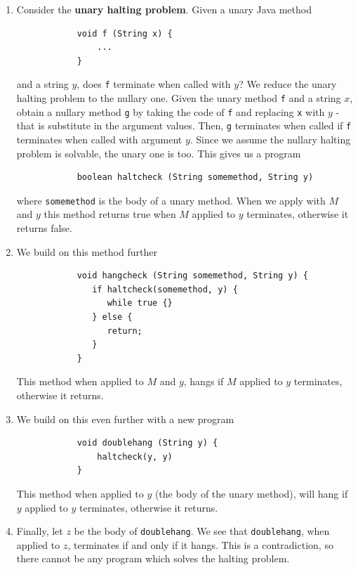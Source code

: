 \documentclass[11pt]{article}
\begin{document}
	\begin{enumerate}
		\item Consider the \textbf{unary halting problem}. Given a unary Java method
		\begin{verbatim}
			void f (String x) {
			    ...
			}
		\end{verbatim}			
		and a string $y$, does \texttt{f} terminate when called with $y$? We reduce the unary halting problem to the nullary one. Given the unary method \texttt{f} and a string $x$, obtain a nullary method \texttt{g} by taking the code of \texttt{f} and replacing \texttt{x} with $y$ - that is substitute in the argument values. Then, \texttt{g} terminates when called if \texttt{f} terminates when called with argument $y$. Since we assume the nullary halting problem is solvable, the unary one is too. This gives us a program
		\begin{verbatim}
			boolean haltcheck (String somemethod, String y)
		\end{verbatim}
		
		where \texttt{somemethod} is the body of a unary method. When we apply with $M$ and $y$ this method returns true when $M$ applied to $y$ terminates, otherwise it returns false.
	
	\item We build on this method further
		\begin{verbatim}
			void hangcheck (String somemethod, String y) {
			   if haltcheck(somemethod, y) {
			      while true {}
			   } else {
			      return;
			   }
			}
		\end{verbatim}	
		
		This method when applied to $M$ and $y$, hangs if $M$ applied to $y$ terminates, otherwise it returns.
				
	\item We build on this even further with a new program
		\begin{verbatim}
			void doublehang (String y) {
			    haltcheck(y, y)
			}
		\end{verbatim}
		
		This method when applied to $y$ (the body of the unary method), will hang if $y$ applied to $y$ terminates, otherwise it returns.
	
	\item Finally, let $z$ be the body of \texttt{doublehang}. We see that \texttt{doublehang}, when applied to $z$, terminates if and only if it hangs. This is a contradiction, so there cannot be any program which solves the halting problem.	
	
	\end{enumerate}
	
\end{document}
